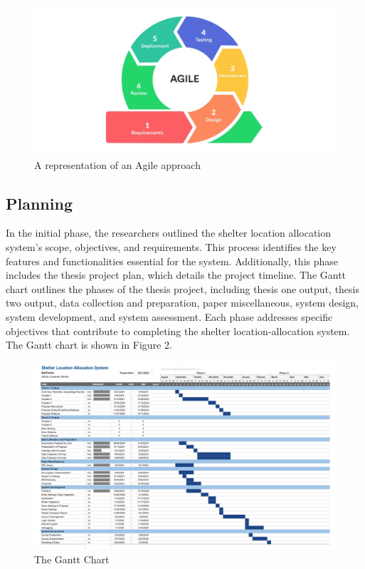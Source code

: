\begin{figure}[h!]
	\caption{A representation of an Agile approach}
	\centering
	\includegraphics[width=\textwidth]{AGILE}
\end{figure}

\subsection{Planning}

	In the initial phase, the researchers outlined the shelter location allocation system's scope, objectives, and requirements. This process identifies the key features and functionalities essential for the system. Additionally, this phase includes the thesis project plan, which details the project timeline.
	The Gantt chart outlines the phases of the thesis project, including thesis one output, thesis two output, data collection and preparation, paper miscellaneous, system design, system development, and system assessment. Each phase addresses specific objectives that contribute to completing the shelter location-allocation system. The Gantt chart is shown in Figure 2.
	
	\begin{figure}[h!]
		\caption{The Gantt Chart}
		\centering
		\includegraphics[width=\textwidth]{Gantt}
	\end{figure}
	
